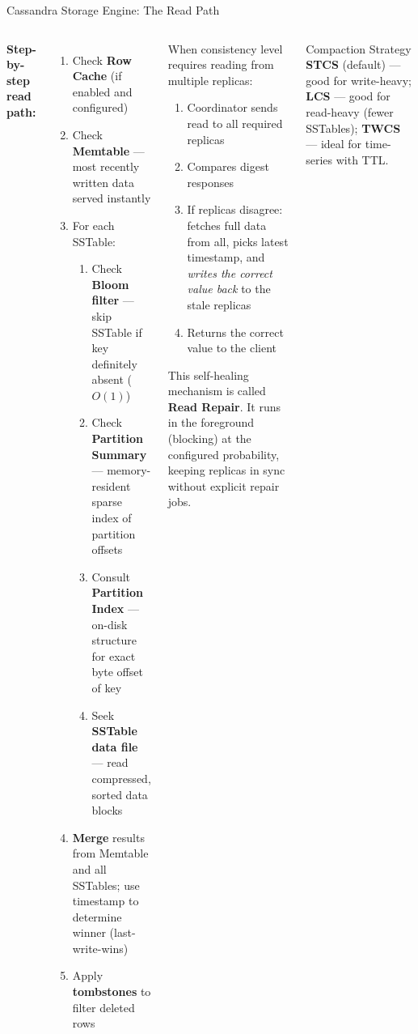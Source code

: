 \documentclass[aspectratio=169]{beamer}
\begin{document}
\begin{frame}{Cassandra Storage Engine: The Read Path}
  \begin{columns}[T]
      \small
      \textbf{Step-by-step read path:}
      \begin{enumerate}
        \item Check \textbf{Row Cache} (if enabled and configured)
        \item Check \textbf{Memtable} — most recently written data served instantly
        \item For each SSTable:
        \begin{enumerate}\scriptsize
          \item Check \textbf{Bloom filter} — skip SSTable if key definitely absent ($O(1)$)
          \item Check \textbf{Partition Summary} — memory-resident sparse index of partition offsets
          \item Consult \textbf{Partition Index} — on-disk structure for exact byte offset of key
          \item Seek \textbf{SSTable data file} — read compressed, sorted data blocks
        \end{enumerate}
        \item \textbf{Merge} results from Memtable and all SSTables; use timestamp to determine winner (last-write-wins)
        \item Apply \textbf{tombstones} to filter deleted rows
      \end{enumerate}
      \begin{tcolorbox}[deepdivebox, title={Deep Dive: Read Repair}]
        \scriptsize
        When consistency level requires reading from multiple replicas:
        \begin{enumerate}
          \item Coordinator sends read to all required replicas
          \item Compares digest responses
          \item If replicas disagree: fetches full data from all, picks latest timestamp, and \textit{writes the correct value back} to the stale replicas
          \item Returns the correct value to the client
        \end{enumerate}
        This self-healing mechanism is called \textbf{Read Repair}. It runs in the foreground (blocking) at the configured probability, keeping replicas in sync without explicit repair jobs.
      \end{tcolorbox}
      \vspace{0.2cm}
      \begin{alertblock}{Compaction Strategy}
        \scriptsize \textbf{STCS} (default) — good for write-heavy; \textbf{LCS} — good for read-heavy (fewer SSTables); \textbf{TWCS} — ideal for time-series with TTL.
      \end{alertblock}
  \end{columns}
\end{frame}
\end{document}
